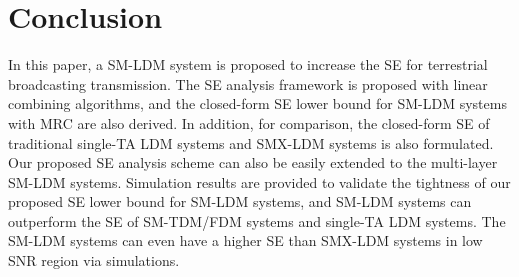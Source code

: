 \documentclass[journal]{IEEEtran}
\begin{document}
\section{Conclusion}
In this paper, a SM-LDM system is proposed to increase the SE for terrestrial broadcasting transmission. The SE analysis framework is proposed with linear combining algorithms, and the closed-form SE lower bound for SM-LDM systems with MRC are also derived. In addition, for comparison, the closed-form SE of traditional single-TA LDM systems and SMX-LDM systems is also formulated. Our proposed SE analysis scheme can also be easily extended to the multi-layer SM-LDM systems. Simulation results are provided to validate the tightness of our proposed SE lower bound for SM-LDM systems, and SM-LDM systems can outperform the SE of SM-TDM/FDM systems and single-TA LDM systems. The SM-LDM systems can even have a higher SE than SMX-LDM systems in low SNR region via simulations.

\ifCLASSOPTIONcaptionsoff
  \newpage
\fi
\end{document}
